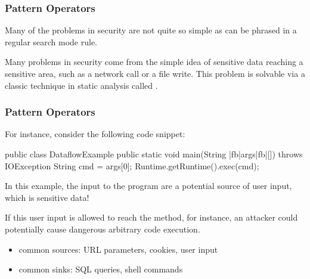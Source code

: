 \documentclass[aspectratio=169, handout]{beamer}
\begin{document}

\begin{frame}[fragile]
  \frametitle{Pattern Operators}

  Many of the problems in security are not quite so simple as can be phrased in
  a regular search mode rule.

  \vspace{\fill}

  Many problems in security come from the simple idea of sensitive data reaching
  a sensitive area, such as a network call or a file write. This problem is solvable
  via a classic technique in static analysis called .

  \vspace{\fill}

\end{frame}

\begin{frame}[fragile]
  \frametitle{Pattern Operators}

  For instance, consider the following code snippet:

  \begin{pythoncodeblock}[language=java]
    public class DataflowExample {
      public static void main(String |fb|args|fb|[]) throws IOException {
        String cmd = args[0];
        Runtime.getRuntime().exec(cmd);
      }
    }
  \end{pythoncodeblock}

  \vspace{\fill}

  In this example, the input  to the program are a potential source of
  user input, which is sensitive data!

  \vspace{\fill}

  If this user input is allowed to reach the  method, for instance,
  an attacker could potentially cause dangerous arbitrary code execution.

  \vspace{\fill}

  \begin{itemize}
    \item common sources: URL parameters, cookies, user input
    \item common sinks: SQL queries, shell commands
  \end{itemize}
\end{frame}
\end{document}

